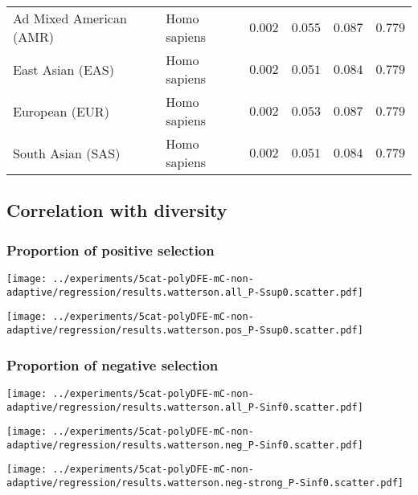 \documentclass{article}
\begin{document}
\begin{center}
\begin{longtable}{|l|l|r|r|r|r|}
            Ad Mixed American (AMR)        & Homo sapiens        & $ 0.002$              & $ 0.055$                & $ 0.087$                 & $ 0.779$                     \\
            East Asian (EAS)               & Homo sapiens        & $ 0.002$              & $ 0.051$                & $ 0.084$                 & $ 0.779$                     \\
            European (EUR)                 & Homo sapiens        & $ 0.002$              & $ 0.053$                & $ 0.087$                 & $ 0.779$                     \\
            South Asian (SAS)              & Homo sapiens        & $ 0.002$              & $ 0.051$                & $ 0.084$                 & $ 0.779$                     \\
        \end{longtable}
    \end{center}

    \subsection{Correlation with diversity}

    \subsubsection{Proportion of positive selection}
    \begin{minipage}{0.32\linewidth}
        \texttt{[image: ../experiments/5cat-polyDFE-mC-non-adaptive/regression/results.watterson.all\_P-Ssup0.scatter.pdf]}
    \end{minipage}
    \begin{minipage}{0.32\linewidth}
        \texttt{[image: ../experiments/5cat-polyDFE-mC-non-adaptive/regression/results.watterson.pos\_P-Ssup0.scatter.pdf]}
    \end{minipage}

    \subsubsection{Proportion of negative selection}
    \begin{minipage}{0.32\linewidth}
        \texttt{[image: ../experiments/5cat-polyDFE-mC-non-adaptive/regression/results.watterson.all\_P-Sinf0.scatter.pdf]}
    \end{minipage}
    \begin{minipage}{0.32\linewidth}
        \texttt{[image: ../experiments/5cat-polyDFE-mC-non-adaptive/regression/results.watterson.neg\_P-Sinf0.scatter.pdf]}
    \end{minipage}
    \begin{minipage}{0.32\linewidth}
        \texttt{[image: ../experiments/5cat-polyDFE-mC-non-adaptive/regression/results.watterson.neg-strong\_P-Sinf0.scatter.pdf]}
    \end{minipage}
\end{document}

